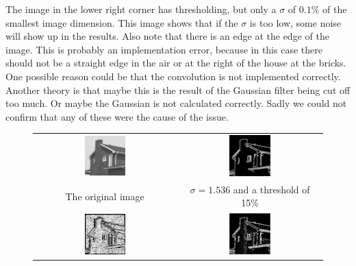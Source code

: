 \documentclass[a4paper]{article}
\begin{document}
\begin{enumerate}
    The image in the lower right corner has thresholding, but only a $\sigma$ of $0.1\%$ of the smallest image dimension.
    This image shows that if the $\sigma$ is too low, some noise will show up in the results.
    Also note that there is an edge at the edge of the image.
    This is probably an implementation error, because in this case there should not be a straight edge in the air or at the right of the house at the bricks.
    One possible reason could be that the convolution is not implemented correctly.
    Another theory is that maybe this is the result of the Gaussian filter being cut off too much.
    Or maybe the Gaussian is not calculated correctly.
    Sadly we could not confirm that any of these were the cause of the issue.
\begin{figure}[H]
\centering
\begin{tabular}{cc}
    \includegraphics[width=0.3\textwidth]{../lab5ex1/house.png} & \includegraphics[width=0.3\textwidth]{../lab5ex1/mrhouse06t15.png} \\
    The original image & $\sigma = 1.536$ and a threshold of 15\% \\
    \includegraphics[width=0.3\textwidth]{../lab5ex1/mrhouse06t0.png} & \includegraphics[width=0.3\textwidth]{../lab5ex1/mrhouse01t15.png} \\

\end{tabular}
\end{figure}
\end{enumerate}
\end{document}
